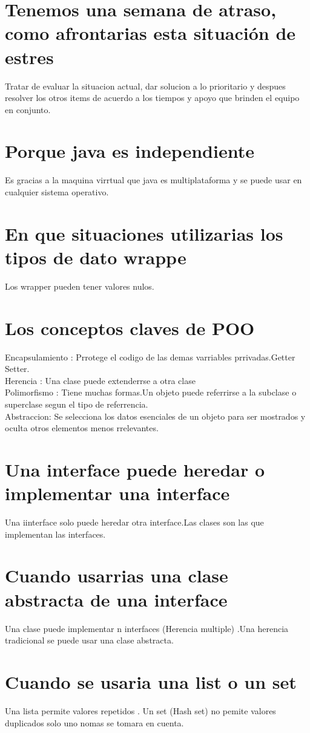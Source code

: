 \section{Tenemos una semana de atraso, como afrontarias esta situaci\'on de estres}
Tratar de evaluar la situacion actual, dar solucion a lo prioritario y despues resolver los otros items de acuerdo a los tiempos y apoyo que brinden el equipo en conjunto. 
\section{Porque java es independiente}
Es gracias a la maquina virrtual que java es multiplataforma y se puede usar en cualquier sistema operativo.
\section{En que situaciones utilizarias los tipos de dato wrappe} 
Los wrapper pueden tener valores nulos.
\section{Los conceptos claves de POO}
Encapsulamiento : Prrotege el codigo de las demas varriables prrivadas.Getter Setter.\\
Herencia : Una clase puede extenderrse a otra clase\\
Polimorfismo : Tiene muchas formas.Un objeto puede referrirse a la subclase o superclase segun el tipo de referrencia.\\
Abstraccion: Se selecciona los datos esenciales de un objeto para ser mostrados y oculta otros elementos menos rrelevantes.
\section{Una interface puede heredar o implementar una interface}
Una iinterface solo puede heredar otra interface.Las clases son las que implementan las interfaces.
\section{Cuando usarrias una clase abstracta de una interface}
Una clase puede implementar n interfaces (Herencia multiple) .Una herencia tradicional se puede usar una clase abstracta.
\section{Cuando se usaria una list o un set}
Una lista permite valores repetidos . Un set (Hash set) no pemite valores duplicados solo uno nomas se tomara en cuenta. 
